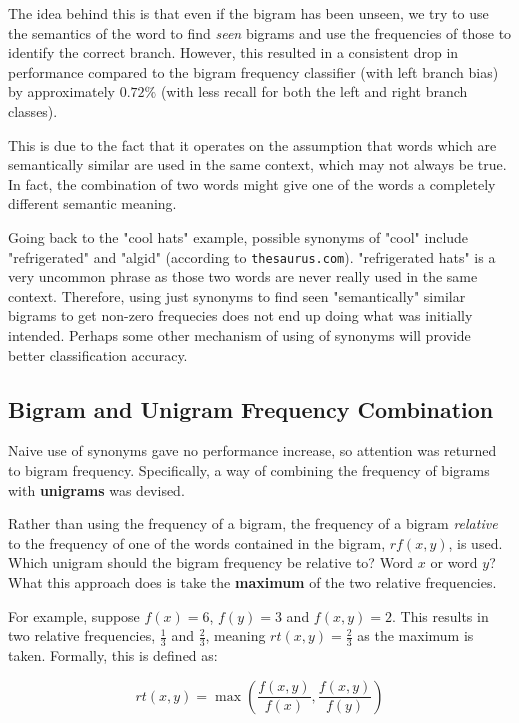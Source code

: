 \documentclass{article}
\begin{document}
The idea behind this is that even if the bigram has been unseen, we try to use the semantics of the word to find \textit{seen} bigrams and use the frequencies of those to identify the correct branch. However, this resulted in a consistent drop in performance compared to the bigram frequency classifier (with left branch bias) by approximately $0.72\%$ (with less recall for both the left and right branch classes).

This is due to the fact that it operates on the assumption that words which are semantically similar are used in the same context, which may not always be true. In fact, the combination of two words might give one of the words a completely different semantic meaning.

Going back to the "cool hats" example, possible synonyms of "cool"  include "refrigerated" and "algid" (according to \texttt{thesaurus.com}). "refrigerated hats" is a very uncommon phrase as those two words are never really used in the same context. Therefore, using just synonyms to find seen "semantically" similar bigrams to get non-zero frequecies does not end up doing what was initially intended. Perhaps some other mechanism of using of synonyms will provide better classification accuracy.

\subsection{Bigram and Unigram Frequency Combination}
\label{sec:rel_freq_classifier}

Naive use of synonyms gave no performance increase, so attention was returned to bigram frequency. Specifically, a way of combining the frequency of bigrams with \textbf{unigrams} was devised.

Rather than using the frequency of a bigram, the frequency of a bigram  \textit{relative} to the frequency of one of the words contained in the bigram, $rf(x, y)$, is used. Which unigram should the bigram frequency be relative to? Word $x$ or word $y$? What this approach does is take the \textbf{maximum} of the two relative frequencies.

For example, suppose $f(x) = 6$, $f(y) = 3$ and $f(x, y) = 2$. This results in two relative frequencies, $\frac{1}{3}$ and $\frac{2}{3}$, meaning $rt(x, y) = \frac{2}{3}$ as the maximum is taken. Formally, this is defined as:

\begin{equation}
	rt(x, y) = \max(\frac{f(x, y)}{f(x)}, \frac{f(x, y)}{f(y)})
\end{equation}
\end{document}
